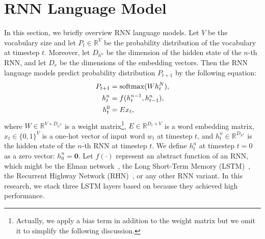 \documentclass[11pt,a4paper]{article}
\begin{document}
\section{RNN Language Model}
In this section, we briefly overview RNN language models.
Let $V$ be the vocabulary size and let $P_{t} \in \mathbb{R}^{V}$ be the probability distribution of the vocabulary at timestep $t$.
Moreover, let $D_{h^n}$ be the dimension of the hidden state of the $n$-th RNN, and let $D_e$ be the dimensions of the embedding vectors.
Then the RNN language models predict probability distribution $P_{t+1}$ by the following equation:
\begin{align}
  P_{t+1} &= {\rm softmax}(W h^{N}_{t}), \label{eq:softmax} \\
  h^{n}_t &= f(h^{n-1}_{t}, h^{n}_{t-1}), \label{eq:rnn} \\
  h^{0}_t &= E x_t, \label{eq:embed}
\end{align}
where $W \in \mathbb{R}^{V \times D_{h^N}}$ is a weight matrix\footnote{Actually, we apply a bias term in addition to the weight matrix but we omit it to simplify the following discussion.}, $E \in \mathbb{R}^{D_e \times V}$ is a word embedding matrix, $x_t \in \{0,1\}^{V}$ is a one-hot vector of input word $w_t$ at timestep $t$, and $h^{n}_{t} \in \mathbb{R}^{D_{h^n}}$ is the hidden state of the $n$-th RNN at timestep $t$.
We define $h^{n}_{t}$ at timestep $t=0$ as a zero vector: $h^{n}_0 = \bm{0}$.
Let $f(\cdot)$ represent an abstract function of an RNN, which might be the Elman network~\cite{elman1990finding}, the Long Short-Term Memory (LSTM)~\cite{Hochreiter:1997:LSM:1246443.1246450}, the Recurrent Highway Network (RHN)~\cite{zilly2016recurrent}, or any other RNN variant.
In this research, we stack three LSTM layers based on  because they achieved high performance.
\end{document}
